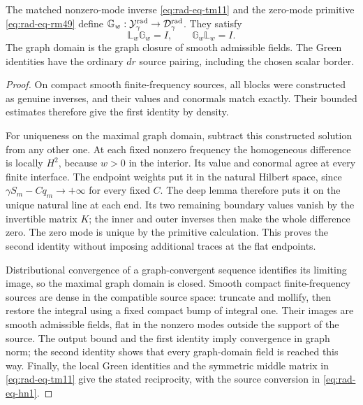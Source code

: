 \begin{lemma}
\label{lem:rad-green-completion}
The matched nonzero-mode inverse \eqref{eq:rad-eq-tm11} and the zero-mode
primitive \eqref{eq:rad-eq-rm49} define
$\mathbb G_w:\mathcal Y_\gamma^{\rm rad}\to\mathcal D_\gamma^{\rm rad}$.
They satisfy
\begin{equation}\label{eq:rad-reference-piecewise-left-identity}
 \mathbb L_w\mathbb G_w=I,\qquad
 \mathbb G_w\mathbb L_w=I.
\end{equation}
The graph domain is the graph closure of smooth admissible fields.
The Green identities have the ordinary $dr$ source pairing, including
the chosen scalar border.
\end{lemma}
\begin{proof}
On compact smooth finite-frequency sources, all blocks were constructed
as genuine inverses, and their values and conormals match exactly.
Their bounded estimates therefore give the first identity by density.

For uniqueness on the maximal graph domain, subtract this constructed
solution from any other one.  At each fixed nonzero frequency the
homogeneous difference is locally $H^2$, because $w>0$ in the
interior.  Its value and conormal agree at every finite interface.
The endpoint weights put it in the natural Hilbert space, since
$\gamma S_m-Cq_m\to+\infty$ for every fixed $C$.
The deep lemma therefore puts it on the unique natural line at each
end.  Its two remaining boundary values vanish by the invertible
matrix $K$; the inner and outer inverses then make the whole difference
zero.  The zero mode is unique by the primitive calculation.
This proves the second identity without imposing additional traces
at the flat endpoints.

Distributional convergence of a graph-convergent sequence identifies
its limiting image, so the maximal graph domain is closed.
Smooth compact finite-frequency sources are dense in the compatible
source space: truncate and mollify, then restore the integral using
a fixed compact bump of integral one.  Their images are smooth
admissible fields, flat in the nonzero modes outside the support of the
source.  The output bound and the first identity imply convergence in
graph norm; the second identity shows that every graph-domain field
is reached this way.  Finally, the local Green identities and the
symmetric middle matrix in \eqref{eq:rad-eq-tm11} give the stated
reciprocity, with the source conversion in \eqref{eq:rad-eq-hn1}.
\end{proof}

